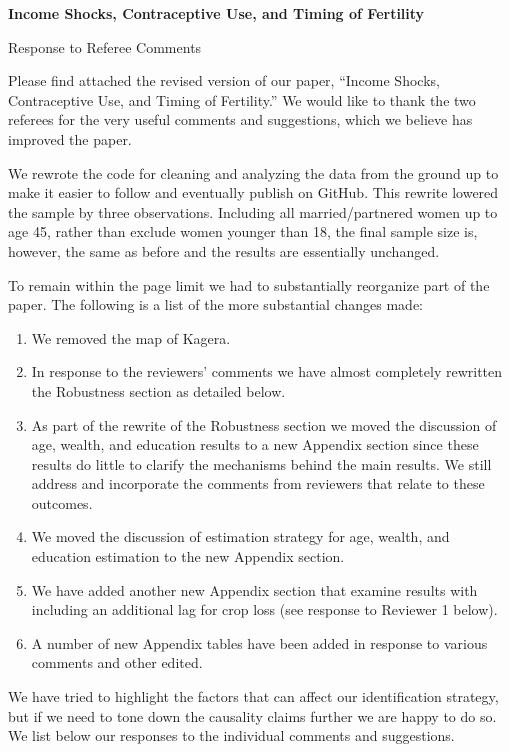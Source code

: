 \documentclass[letterpaper,12pt]{article}
\title{} \author{}
\begin{document}
\begin{center} \textbf{\large Income Shocks, Contraceptive Use, and
Timing of Fertility} \end{center}

\begin{center} Response to Referee Comments \end{center}

\noindent Please find attached the revised version of our paper,
``Income Shocks, Contraceptive Use, and Timing of Fertility.''
We would like to thank the two referees for the very useful comments and
suggestions,
which we believe has improved the paper.

We rewrote the code for cleaning and analyzing the data from the ground up 
to make it easier to follow and eventually publish on GitHub.
This rewrite lowered the sample by three observations.
Including all married/partnered women up to age 45, rather than exclude
women younger than 18, the final sample size is, however, the same as 
before and the results are essentially unchanged.

To remain within the page limit we had to substantially reorganize
part of the paper.
The following is a list of the more substantial changes made:
\begin{enumerate}
\item We removed the map of Kagera.
\item In response to the reviewers' comments we have almost completely
rewritten the Robustness section as detailed below.
\item As part of the rewrite of the Robustness section we moved 
the discussion of age, wealth, and education results to a new Appendix
section since these results do little to clarify the mechanisms 
behind the main results.
We still address and incorporate the comments from reviewers that
relate to these outcomes.
\item We moved the discussion of estimation strategy for age,
wealth, and education estimation to the new Appendix section.
\item We have added another new Appendix section that examine results 
with including an additional lag for crop loss (see response to
Reviewer 1 below).
\item A number of new Appendix tables have been added in response
to various comments and other edited.
\end{enumerate}

We have tried to highlight the factors that can affect our identification 
strategy, but if we need to tone down the causality claims further
we are happy to do so.
We list below our responses to the individual comments and suggestions.
\end{document}
